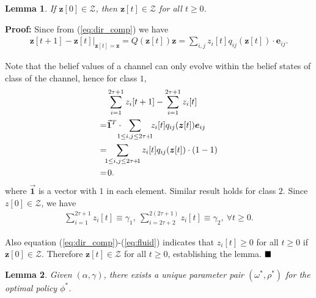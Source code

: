 \documentclass[11pt,twocolumn]{IEEEtran}
\newtheorem{lemma}{Lemma}
\begin{document}
\begin{lemma}
\label{lemma:WitinZ}
If $\bm z[0]\in \mathcal{Z}$, then $\bm z[t]\in \mathcal{Z}$ for all $t \geq 0$.
\end{lemma}

\noindent \textbf{Proof:}
Since from (\ref{eq:dir_comp}) we have
\begin{align}
\bm z[t+1]-\bm z[t] \Big|_{\bm z[t]=\bm z} = Q(\bm z[t])\bm z=\sum_{i,j} z_i[t] q_{ij}(\bm z[t]) \cdot \bm e_{ij}. \nonumber
\end{align}

Note that the belief values of a channel can only evolve within the belief states of class of the channel, hence for class $1$,
\begin{align}
&\sum_{i=1}^{2\tau+1} z_i[t+1]-\sum_{i=1}^{2\tau+1} z_i[t]\nonumber\\
=& \vec{\bm 1}^T \cdot \hspace{-7pt} \sum_{1{\leq}i,j\leq{2\tau\hspace{-0.5pt} {+}\hspace{-1.5pt} 1}}  \hspace{-4pt} z_i[t] q_{ij}(\bm z[t]) \bm e_{ij} \nonumber \\
=&\hspace{-4pt} \sum_{1{\leq}i,j\leq{2\tau\hspace{-0.5pt} {+}\hspace{-1.5pt} 1}} z_i[t] q_{ij}(\bm z[t]) \cdot (1-1)\nonumber \\
=&\hspace{1pt}0. \nonumber
\end{align}
where $\vec{\bm 1}$ is a vector with $1$ in each element. Similar result holds for class $2$. Since $z[0] {\in} \mathcal{Z}$, we have
\begin{align}
\sum_{i=1}^{2\tau+1} z_i[t]\equiv \gamma_1, \ \sum_{i=2\tau+2}^{2(2\tau+1)} z_i[t]\equiv \gamma_2, \ \forall t\geq 0. \nonumber
\end{align}

Also equation (\ref{eq:dir_comp})-(\ref{eq:fluid}) indicates that $z_i[t]{\geq} 0$ for all $t{\geq} 0$ if $\bm z[0] \in \mathcal{Z}$. Therefore $\bm z[t] {\in} \mathcal{Z}$ for all $t\geq 0$, establishing the lemma. $\hfill \blacksquare$
\vspace{6pt}

\begin{lemma}
\label{lemma:alpha_achieve}
Given $(\alpha, \gamma)$, there exists a unique parameter pair $(\omega^*,\rho^*)$ for the optimal policy $\phi^*$.
\end{lemma}
\end{document}
